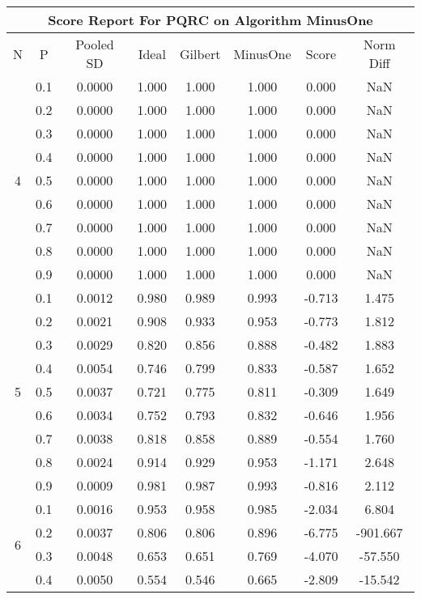\documentclass[11pt,a4paper]{report}
\begin{document}
\begin{longtable}{ | c | c || c | c | c | c | c | c | }
\hline
\multicolumn{8}{|c|}{ Score Report For PQRC on Algorithm MinusOne} \\
\hline
N & P & Pooled SD &  Ideal &  Gilbert & MinusOne  & Score & Norm Diff \\
 \hline
 \hline
 \endhead
\multirow{9}{*}{4} & 0.1 & 0.0000 & 1.000 & 1.000 & 1.000 & 0.000 & NaN \\
 & 0.2 & 0.0000 & 1.000 & 1.000 & 1.000 & 0.000 & NaN \\
 & 0.3 & 0.0000 & 1.000 & 1.000 & 1.000 & 0.000 & NaN \\
 & 0.4 & 0.0000 & 1.000 & 1.000 & 1.000 & 0.000 & NaN \\
 & 0.5 & 0.0000 & 1.000 & 1.000 & 1.000 & 0.000 & NaN \\
 & 0.6 & 0.0000 & 1.000 & 1.000 & 1.000 & 0.000 & NaN \\
 & 0.7 & 0.0000 & 1.000 & 1.000 & 1.000 & 0.000 & NaN \\
 & 0.8 & 0.0000 & 1.000 & 1.000 & 1.000 & 0.000 & NaN \\
 & 0.9 & 0.0000 & 1.000 & 1.000 & 1.000 & 0.000 & NaN \\
 \hline
\multirow{9}{*}{5} & 0.1 & 0.0012 & 0.980 & 0.989 & 0.993 & -0.713 & 1.475 \\
 & 0.2 & 0.0021 & 0.908 & 0.933 & 0.953 & -0.773 & 1.812 \\
 & 0.3 & 0.0029 & 0.820 & 0.856 & 0.888 & -0.482 & 1.883 \\
 & 0.4 & 0.0054 & 0.746 & 0.799 & 0.833 & -0.587 & 1.652 \\
 & 0.5 & 0.0037 & 0.721 & 0.775 & 0.811 & -0.309 & 1.649 \\
 & 0.6 & 0.0034 & 0.752 & 0.793 & 0.832 & -0.646 & 1.956 \\
 & 0.7 & 0.0038 & 0.818 & 0.858 & 0.889 & -0.554 & 1.760 \\
 & 0.8 & 0.0024 & 0.914 & 0.929 & 0.953 & -1.171 & 2.648 \\
 & 0.9 & 0.0009 & 0.981 & 0.987 & 0.993 & -0.816 & 2.112 \\
 \hline
\multirow{9}{*}{6} & 0.1 & 0.0016 & 0.953 & 0.958 & 0.985 & -2.034 & 6.804 \\
 & 0.2 & 0.0037 & 0.806 & 0.806 & 0.896 & -6.775 & -901.667 \\
 & 0.3 & 0.0048 & 0.653 & 0.651 & 0.769 & -4.070 & -57.550 \\
 & 0.4 & 0.0050 & 0.554 & 0.546 & 0.665 & -2.809 & -15.542 \\

\end{longtable}
\end{document}
